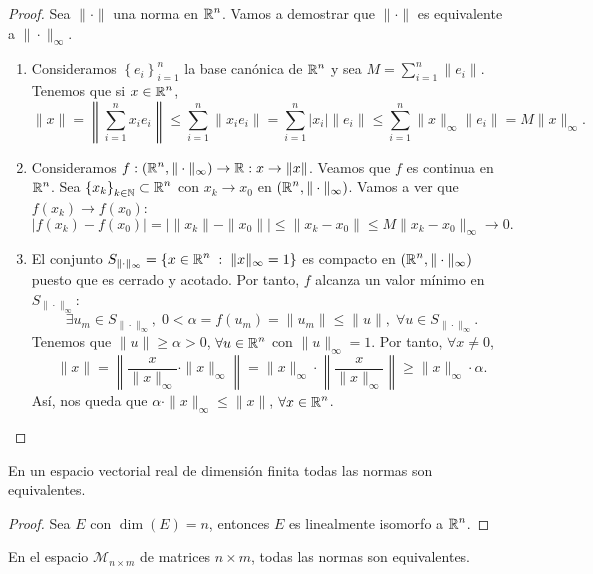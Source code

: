 \begin{proof}
Sea $\displaystyle \| \cdot \| $ una norma en $\displaystyle \mathbb{R}^{n} $. Vamos a demostrar que $\displaystyle \| \cdot \| $ es equivalente a $\displaystyle \| \cdot \|_{\infty} $. 
\begin{enumerate}
	\item Consideramos $\displaystyle \left\{ e_{i}\right\} _{i = 1}^{n} $ la base canónica de $\displaystyle \mathbb{R}^{n} $ y sea $\displaystyle M = \sum^{n}_{i = 1}\|e_{i}\| $. Tenemos que si $\displaystyle x \in \mathbb{R}^{n} $,
		\[\|x\| = \left\|\sum^{n}_{i = 1}x_{i}e_{i}\right\| \leq \sum^{n}_{i = 1} \|x_{i}e_{i}\| = \sum^{n}_{i = 1} \left|x_{i}\right| \|e_{i}\| \leq \sum^{n}_{i = 1} \| x \|_{\infty}\|e_{i}\| = M\|x\|_{\infty} .\]
	\item Consideramos $\displaystyle f : \left(\mathbb{R}^{n}, \| \cdot \|_{\infty}\right) \to \mathbb{R} : x \to \| x\|$. Veamos que $\displaystyle f $ es continua en $\displaystyle \mathbb{R}^{n} $. Sea $\displaystyle \left\{ x_{k}\right\} _{k \in \mathbb{N}} \subset \mathbb{R}^{n}$ con $\displaystyle x_{k} \to x_{0} $ en $\displaystyle \left(\mathbb{R}^{n}, \| \cdot \| _{\infty}\right) $. 
Vamos a ver que $\displaystyle f\left(x_{k}\right) \to f\left(x_{0}\right) $:
\[ \left|f\left(x_{k}\right) -f\left(x_{0}\right)\right| = \left| \| x_{k}\| - \|x_{0}\|\right| \leq \| x_{k}-x_{0}\| \leq M\|x_{k}-x_{0}\|_{\infty} \to 0 .\]
\item El conjunto $\displaystyle S_{\| \cdot \|_{\infty}} = \left\{ x \in \mathbb{R}^{n} \; : \; \|x\|_{\infty} = 1\right\}  $ es compacto en $\displaystyle \left(\mathbb{R}^{n}, \| \cdot \|_{\infty}\right) $ puesto que es cerrado y acotado. Por tanto, $\displaystyle f $ alcanza un valor mínimo en $\displaystyle S_{\| \cdot \|_{\infty}} $:
	\[\exists u_{m} \in S_{\| \cdot \|_{\infty}}, \; 0 < \alpha = f\left(u_{m}\right) = \|u_{m}\| \leq \|u\|, \; \forall u \in S_{\| \cdot \|_{\infty}} .\]
	Tenemos que $\displaystyle \|u\| \geq \alpha > 0 $, $\displaystyle \forall u \in \mathbb{R}^{n} $ con $\displaystyle \|u\|_{\infty} = 1 $. Por tanto, $\displaystyle \forall x \neq 0 $,
	\[\|x\| = \left\|\frac{x}{\|x\|_{\infty}} \cdot \|x\|_{\infty}\right\| = \|x\|_{\infty} \cdot \left\|\frac{x}{\|x\|_{\infty}}\right\| \geq \|x\|_{\infty} \cdot \alpha .\]
	Así, nos queda que $\displaystyle \alpha \cdot \|x\|_{\infty} \leq \|x\| $, $\displaystyle \forall x \in \mathbb{R}^{n} $. 
\end{enumerate}
\end{proof}
\begin{colorary}
En un espacio vectorial real de dimensión finita todas las normas son equivalentes. 
\end{colorary}
\begin{proof}
Sea $\displaystyle E $ con $\displaystyle \dim\left(E\right) = n $, entonces $\displaystyle E $ es linealmente isomorfo a $\displaystyle \mathbb{R}^{n} $. 
\end{proof}
\begin{eg}
En el espacio $\displaystyle \mathcal{M}_{n \times m} $ de matrices $\displaystyle n \times m $, todas las normas son equivalentes. 
\end{eg}
